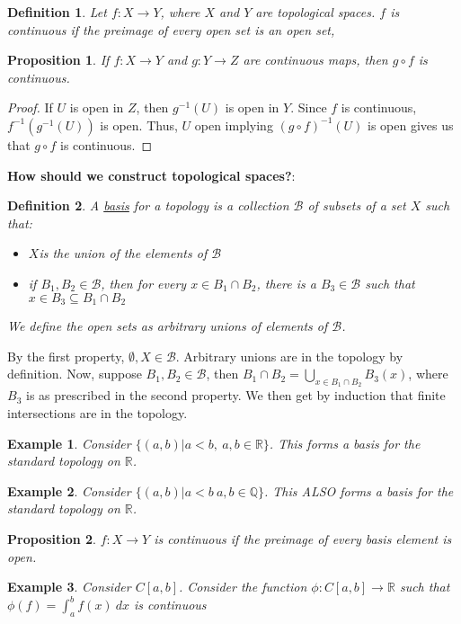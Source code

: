\documentclass{article}
\newcommand{\R}{\mathbb{R}}
\newcommand{\Q}{\mathbb{Q}}
\newtheorem{example}{Example}
\newtheorem{proposition}{Proposition}
\newtheorem{definition}{Definition}
\begin{document}
\begin{definition}
Let $f:X\rightarrow Y$, where $X$ and $Y$ are topological spaces. $f$ is continuous if the preimage of every open set is an open set,
\end{definition}
\begin{proposition}
If $f:X\rightarrow Y$ and $g:Y\rightarrow Z$ are continuous maps, then $g\circ f$ is continuous.
\end{proposition}
\begin{proof}
If $U$ is open in $Z$, then $g^{-1}(U)$ is open in $Y$. Since $f$ is continuous, $f^{-1}(g^{-1}(U))$ is open. Thus, $U$ open implying $(g\circ f)^{-1}(U)$ is open gives us that $g\circ f$ is continuous.
\end{proof}
\noindent \textbf{How should we construct topological spaces?}:
\begin{definition}
A \underline{basis} for a topology is a collection $\mathcal{B}$ of subsets of a set $X$ such that:
\begin{itemize}
    \item $X$is the union of the elements of $\mathcal{B}$
    \item if $B_1,B_2\in\mathcal{B}$, then for every $x\in B_1\cap B_2$, there is a $B_3\in\mathcal{B}$ such that $x\in B_3\subseteq B_1\cap B_2$
\end{itemize}
We define the open sets as arbitrary unions of elements of $\mathcal{B}$.
\end{definition}
\noindent By the first property, $\emptyset, X\in \mathcal{B}$. Arbitrary unions are in the topology by definition. Now, suppose $B_1,B_2\in\mathcal{B}$, then $B_1\cap B_2=\displaystyle\bigcup_{x\in B_1\cap B_2} B_3(x)$, where $B_3$ is as prescribed in the second property. We then get by induction that finite intersections are in the topology.
\begin{example}
Consider $\{(a,b)|a<b,\ a,b\in\R\}$. This forms a basis for the standard topology on $\R$. 
\end{example}
\begin{example}
Consider $\{(a,b)|a<b\ a,b\in\Q\}$. This ALSO forms a basis for the standard topology on $\R$.
\end{example}
\begin{proposition}
$f:X\rightarrow Y$ is continuous if the preimage of every basis element is open.
\end{proposition}
\begin{example}
Consider $C[a,b]$. Consider the function $\phi:C[a,b]\rightarrow \R$ such that $\phi(f)=\int_a^b f(x)\ dx$ is continuous
\end{example}
\end{document}
